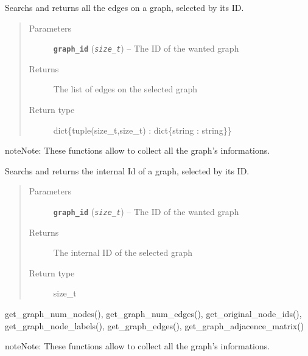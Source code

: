 \documentclass[letterpaper,10pt,english]{sphinxmanual}
\begin{document}

\begin{fulllineitems}
\label{doc:gedlibpy.get_graph_edges}
Searchs and returns all the edges on a graph, selected by its ID.
\begin{quote}\begin{description}
\item[{Parameters}] \leavevmode
\textbf{\texttt{graph\_id}} (\emph{\texttt{size\_t}}) -- The ID of the wanted graph

\item[{Returns}] \leavevmode
The list of edges on the selected graph

\item[{Return type}] \leavevmode
dict\{tuple(size\_t,size\_t) : dict\{string : string\}\}

\end{description}\end{quote}

\begin{notice}{note}{Note:}
These functions allow to collect all the graph's informations.
\end{notice}

\end{fulllineitems}


\begin{fulllineitems}
\label{doc:gedlibpy.get_graph_internal_id}
Searchs and returns the internal Id of a graph, selected by its ID.
\begin{quote}\begin{description}
\item[{Parameters}] \leavevmode
\textbf{\texttt{graph\_id}} (\emph{\texttt{size\_t}}) -- The ID of the wanted graph

\item[{Returns}] \leavevmode
The internal ID of the selected graph

\item[{Return type}] \leavevmode
size\_t

\end{description}\end{quote}




get\_graph\_num\_nodes(), get\_graph\_num\_edges(), get\_original\_node\_ids(), get\_graph\_node\_labels(), get\_graph\_edges(), get\_graph\_adjacence\_matrix()



\begin{notice}{note}{Note:}
These functions allow to collect all the graph's informations.
\end{notice}

\end{fulllineitems}
\end{document}
